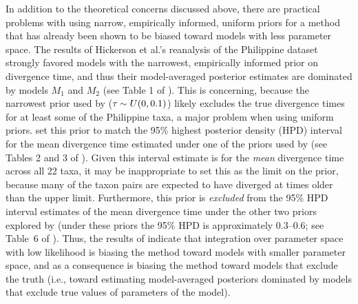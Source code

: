 \documentclass[letterpaper,12pt]{article}
\begin{document}
\begin{linenumbers}
In addition to the theoretical concerns discussed above, there are practical
problems with using narrow, empirically informed, uniform priors for a method
that has already been shown to be biased toward models with less parameter
space.
The results of Hickerson et al.'s \citeyear{Hickerson2013} reanalysis of the
Philippine dataset strongly favored models with the narrowest, empirically
informed prior on divergence time, and thus their model-averaged posterior
estimates are dominated by models $M_1$ and $M_2$ (see Table 1 of
\citet{Hickerson2013}).
This is concerning, because the narrowest \divt{} prior used by
\citet{Hickerson2013} ($\tau_{} \sim U(0,0.1)$) likely excludes the true
divergence times for at least some of the Philippine taxa, a major problem when
using uniform priors.
\citet{Hickerson2013} set this prior to match the 95\% highest posterior
density (HPD) interval for the mean divergence time estimated under one of the
priors used by \citet{Oaks2012} (see Tables 2 and 3 of \citet{Oaks2012}).
Given this interval estimate is for the \emph{mean} divergence time across all
22 taxa, it may be inappropriate to set this as the limit on the prior, because
many of the taxon pairs are expected to have diverged at times older than the
upper limit.
Furthermore, this prior is \emph{excluded} from the 95\% HPD interval estimates
of the mean divergence time under the other two priors explored by
\citet{Oaks2012} (under these priors the 95\% HPD is approximately 0.3--0.6;
see Table~6 of \citet{Oaks2012}).
Thus, the results of \citet{Hickerson2013} indicate that integration over
parameter space with low likelihood is biasing the method toward models with
smaller parameter space, and as a consequence is biasing the method toward
models that exclude the truth (i.e., toward estimating model-averaged
posteriors dominated by models that exclude true values of parameters of the
model).



\end{linenumbers}
\end{document}
